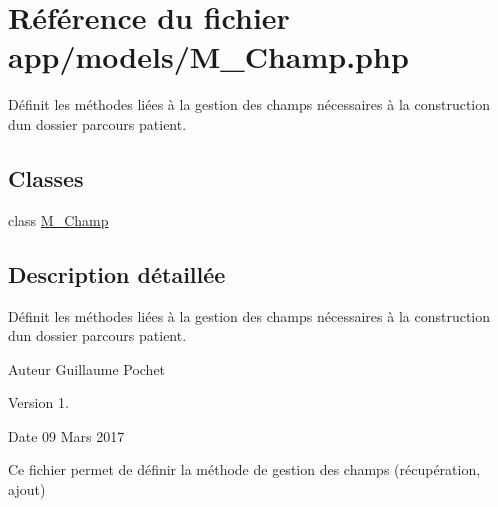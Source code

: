 \hypertarget{_m___champ_8php}{}\section{Référence du fichier app/models/\+M\+\_\+\+Champ.php}
\label{_m___champ_8php}


Définit les méthodes liées à la gestion des champs nécessaires à la construction d\textquotesingle{}un dossier parcours patient.  


\subsection*{Classes}
\begin{DoxyCompactItemize}
\item 
class \hyperlink{class_m___champ}{M\+\_\+\+Champ}
\end{DoxyCompactItemize}


\subsection{Description détaillée}
Définit les méthodes liées à la gestion des champs nécessaires à la construction d\textquotesingle{}un dossier parcours patient. 

\begin{DoxyAuthor}{Auteur}
Guillaume Pochet 
\end{DoxyAuthor}
\begin{DoxyVersion}{Version}
1. 
\end{DoxyVersion}
\begin{DoxyDate}{Date}
09 Mars 2017
\end{DoxyDate}
Ce fichier permet de définir la méthode de gestion des champs (récupération, ajout) 